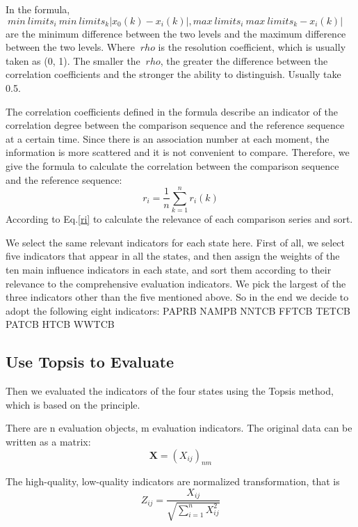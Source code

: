 \documentclass{mcmthesis}
\begin{document}
In the formula, $ \ min \ limits_ {i} \ min \ limits_ {k} | x_0 (k) - x_i (k) |, max \ limits_ {i} \ max \ limits_ {k} - x_i (k) | $ are the minimum difference between the two levels and the maximum difference between the two levels.
Where $ \ rho $ is the resolution coefficient, which is usually taken as (0, 1). The smaller the $ \ rho $, the greater the difference between the correlation coefficients and the stronger the ability to distinguish. Usually take 0.5.

The correlation coefficients defined in the formula describe an indicator of the correlation degree between the comparison sequence and the reference sequence at a certain time. Since there is an association number at each moment, the information is more scattered and it is not convenient to compare. Therefore, we give the formula to calculate the correlation between the comparison sequence and the reference sequence:
\begin{equation}
  r_i = \frac{1}{n}\sum\limits_{k=1}^{n}r_i(k) 
  \label{ri}
\end{equation}
According to Eq.\ref{ri} to calculate the relevance of each comparison series and sort.

We select the same relevant indicators for each state here.
First of all, we select five indicators that appear in all the states, and then assign the weights of the ten main influence indicators in each state, and sort them according to their relevance to the comprehensive evaluation indicators. We pick the largest of the three indicators other than the five mentioned above. So in the end we decide to adopt the following eight indicators:
PAPRB  NAMPB  NNTCB  FFTCB  TETCB  PATCB  HTCB  WWTCB
\subsection{Use Topsis to Evaluate}
Then we evaluated the indicators of the four states using the Topsis method, which is based on the principle\cite{wikitopsis}.

There are n evaluation objects, m evaluation indicators. The original data can be written as a matrix:
\begin{equation}
  \mathbf{X} = (X_{ij})_{nm} 
\end{equation}

The high-quality, low-quality indicators are normalized transformation, that is
\begin{equation}
  Z_{ij} = \frac{X_{ij}}{\sqrt{\sum\limits_{i=1}^{n}X_{ij}^2}}
\end{equation}
\end{document}

